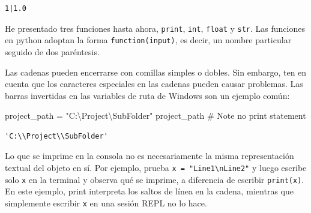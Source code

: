 \documentclass[
  letterpaper,
]{scrbook}
\newenvironment{Shaded}{\begin{snugshade}}{\end{snugshade}}
\newcommand{\CommentTok}[1]{\textcolor[rgb]{0.37,0.37,0.37}{#1}}
\newcommand{\NormalTok}[1]{\textcolor[rgb]{0.00,0.23,0.31}{#1}}
\newcommand{\OperatorTok}[1]{\textcolor[rgb]{0.37,0.37,0.37}{#1}}
\newcommand{\StringTok}[1]{\textcolor[rgb]{0.13,0.47,0.30}{#1}}
\begin{document}
\begin{verbatim}
1|1.0
\end{verbatim}

\begin{tcolorbox}[enhanced jigsaw, colbacktitle=quarto-callout-note-color!10!white, arc=.35mm, opacityback=0, colframe=quarto-callout-note-color-frame, colback=white, left=2mm, leftrule=.75mm, title={Note}, bottomtitle=1mm, rightrule=.15mm, toptitle=1mm, coltitle=black, titlerule=0mm, toprule=.15mm, bottomrule=.15mm, opacitybacktitle=0.6, breakable]

He presentado tres funciones hasta ahora, \texttt{print}, \texttt{int},
\texttt{float} y \texttt{str}. Las funciones en python adoptan la forma
\texttt{function(input)}, es decir, un nombre particular seguido de dos
paréntesis.

\end{tcolorbox}

Las cadenas pueden encerrarse con comillas simples o dobles. Sin
embargo, ten en cuenta que los caracteres especiales en las cadenas
pueden causar problemas. Las barras invertidas en las variables de ruta
de Windows son un ejemplo común:

\begin{Shaded}
\begin{Highlighting}[]
\NormalTok{project\_path }\OperatorTok{=} \StringTok{"C:\textbackslash{}Project\textbackslash{}SubFolder"}
\NormalTok{project\_path }\CommentTok{\# Note no print statement}
\end{Highlighting}
\end{Shaded}

\begin{verbatim}
'C:\\Project\\SubFolder'
\end{verbatim}

\begin{tcolorbox}[enhanced jigsaw, colbacktitle=quarto-callout-note-color!10!white, arc=.35mm, opacityback=0, colframe=quarto-callout-note-color-frame, colback=white, left=2mm, leftrule=.75mm, title={Note}, bottomtitle=1mm, rightrule=.15mm, toptitle=1mm, coltitle=black, titlerule=0mm, toprule=.15mm, bottomrule=.15mm, opacitybacktitle=0.6, breakable]

Lo que se imprime en la consola no es necesariamente la misma
representación textual del objeto en sí. Por ejemplo, prueba
\texttt{x\ =\ "Line1\textbackslash{}nLine2"} y luego escribe solo
\texttt{x} en la terminal y observa qué se imprime, a diferencia de
escribir \texttt{print(x)}. En este ejemplo, print interpreta los saltos
de línea en la cadena, mientras que simplemente escribir \texttt{x} en
una sesión REPL no lo hace.

\end{tcolorbox}
\end{document}
